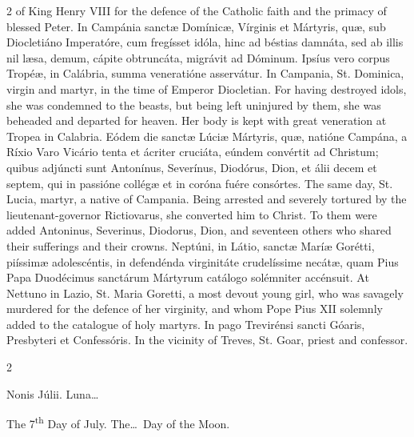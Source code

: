 \begin{paracol}{2}
 of King Henry VIII for the defence of the Catholic faith and the primacy of 
 blessed Peter.
\switchcolumn*
{}
In Campánia sanctæ 
 Domínicæ, Vírginis et Mártyris, quæ, sub Diocletiáno Imperatóre, cum 
 fregísset idóla, hinc ad béstias damnáta, sed ab illis nil læsa, demum, 
 cápite obtruncáta, migrávit ad Dóminum. Ipsíus vero corpus Tropéæ, in 
 Calábria, summa veneratióne asservátur.
\switchcolumn
{}
In Campania, St. Dominica, virgin 
 and martyr, in the time of Emperor Diocletian. For having destroyed 
 idols, she was condemned to the beasts, but being left uninjured by them, 
 she was beheaded and departed for heaven. Her body is kept with great 
 veneration at Tropea in Calabria.
\switchcolumn*
{}
Eódem die sanctæ Lúciæ 
 Mártyris, quæ, natióne Campána, a Ríxio Varo Vicário tenta et ácriter 
 cruciáta, eúndem convértit ad Christum; quibus adjúncti sunt Antonínus, 
 Severínus, Diodórus, Dion, et álii decem et septem, qui in passióne collégæ 
 et in coróna fuére consórtes.
\switchcolumn
{}
The same day, St. Lucia, martyr, a 
 native of Campania. Being arrested and severely tortured by the 
 lieutenant-governor Rictiovarus, she converted him to Christ. To them 
 were added Antoninus, Severinus, Diodorus, Dion, and seventeen others who 
 shared their sufferings and their crowns.
\switchcolumn*
{}
Neptúni, in Látio, 
 sanctæ Maríæ Gorétti, piíssimæ adolescéntis, in defendénda virginitáte 
 crudelíssime necátæ, quam Pius Papa Duodécimus sanctárum Mártyrum catálogo 
 solémniter accénsuit.
\switchcolumn
{}
At Nettuno in Lazio, St. Maria 
 Goretti, a most devout young girl, who was savagely murdered for the defence 
 of her virginity, and whom Pope Pius XII solemnly added to the 
 catalogue of holy martyrs.
\switchcolumn*
{}
In pago Trevirénsi 
 sancti Góaris, Presbyteri et Confessóris.
\switchcolumn
{}
In the vicinity of Treves, St. Goar, 
 priest and confessor.
\switchcolumn*
{}
\end{paracol}


\begin{paracol}{2}
\begin{center}{\color{gregoriocolor} Nonis Júlii. 
 Luna\dots\ }\end{center}
\switchcolumn
{}
\begin{center}{\color{gregoriocolor} The 
 7\textsuperscript{th} Day of 
 July. The\dots\ Day of the Moon.}\end{center}
\end{paracol}

